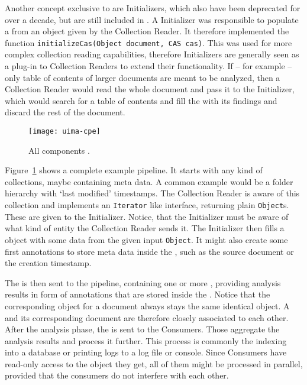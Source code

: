 Another concept exclusive to \uimacpe{} are \cas{} Initializers, which also have been deprecated for over a decade, but are still included in \uima{}. A \cas{} Initializer was responsible to populate a \cas{} from an object given by the Collection Reader. It therefore implemented the function \lstinline|initializeCas(Object document, CAS cas)|. This was used for more complex collection reading capabilities, therefore \cas{} Initializers are generally seen as a plug-in to Collection Readers to extend their functionality. If -- for example -- only table of contents of larger documents are meant to be analyzed, then a Collection Reader would read the whole document and pass it to the \cas{} Initializer, which would search for a table of contents and fill the \cas{} with its findings and discard the rest of the document.


\begin{figure}[hbt]
	
	\centering
	\texttt{[image: uima-cpe]}
	\caption[All \uimacpe{} components.]{All \uimacpe{} components \cite{uimacpe}.}
	\label{fig:uimacpe}
\end{figure}


Figure~\ref{fig:uimacpe} shows a complete example pipeline. It starts with any kind of collections, maybe containing meta data. A common example would be a folder hierarchy with `last modified' timestamps. The Collection Reader is aware of this collection and implements an \lstinline|Iterator| like interface, returning plain \lstinline|Object|s. These are given to the \cas{} Initializer. Notice, that the \cas{} Initializer must be aware of what kind of entity the Collection Reader sends it. The \cas{} Initializer then fills a \cas{} object with some data from the given input \lstinline|Object|. It might also create some first annotations to store meta data inside the \cas{}, such as the source document \URL{} or the creation timestamp. 

The \cas{} is then sent to the pipeline, containing one or more \anens{}, providing analysis results in form of annotations that are stored inside the \cas{}. Notice that the corresponding \cas{} object for a document always stays the same identical object. A \cas{} and its corresponding document are therefore closely associated to each other. After the analysis phase, the \cas{} is sent to the \cas{} Consumers. Those aggregate the analysis results and process it further. This process is commonly the indexing into a database or printing logs to a log file or console. Since \cas{} Consumers have read-only access to the \cas{} object they get, all of them might be processed in parallel, provided that the consumers do not interfere with each other.

